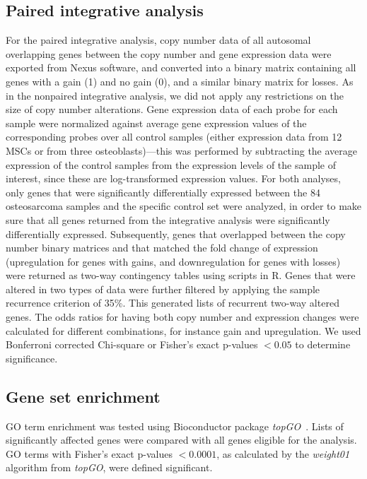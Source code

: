 \subsection{Paired integrative analysis}
For the paired integrative analysis, copy number
data of all autosomal overlapping genes
between the copy number and gene expression
data were exported from Nexus software, and
converted into a binary matrix containing all
genes with a gain (1) and no gain (0), and a similar
binary matrix for losses. As in the nonpaired
integrative analysis, we did not apply any restrictions
on the size of copy number alterations.
Gene expression data of each probe for each sample
were normalized against average gene expression
values of the corresponding probes over all
control samples (either expression data from 12
MSCs or from three osteoblasts)---this was performed
by subtracting the average expression of
the control samples from the expression levels of
the sample of interest, since these are log\hyp{}transformed
expression values. For both analyses, only
genes that were significantly differentially
expressed between the 84 osteosarcoma samples
and the specific control set were analyzed, in
order to make sure that all genes returned from
the integrative analysis were significantly differentially
expressed. Subsequently, genes that overlapped
between the copy number binary matrices
and that matched the fold change of expression
(upregulation for genes with gains, and downregulation
for genes with losses) were returned as
two-way contingency tables using scripts in R.
Genes that were altered in two types of data
were further filtered by applying the sample recurrence
criterion of 35\%. This generated lists of
recurrent two-way altered genes. The odds ratios
for having both copy number and expression
changes were calculated for different combinations,
for instance gain and upregulation. We
used Bonferroni corrected Chi-square or Fisher's
exact p-values $<0.05$ to determine significance.

\subsection{Gene set enrichment}
GO term enrichment was tested using Bioconductor
package {\it topGO}~\cite{alexa2006improved}. Lists
of significantly affected genes were compared
with all genes eligible for the analysis. GO terms
with Fisher's exact p-values $<0.0001$, as calculated
by the {\it weight01} algorithm from {\it topGO}, were
defined significant.


